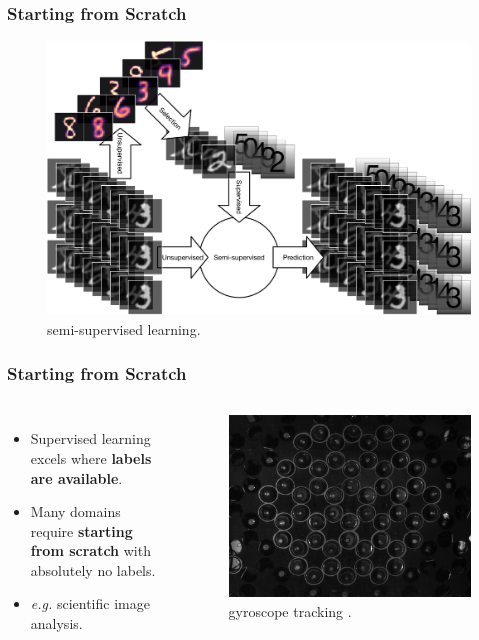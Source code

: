 \documentclass[10pt, usenames, dvipsnames, table]{beamer}
\begin{document}
\begin{frame}
  \frametitle{Starting from Scratch}
  \begin{figure}
    \centering
    \includegraphics[width=\linewidth]{docs/query_selection}
    \caption{semi-supervised learning.}
    \label{fig:semi-supervised}
  \end{figure}
\end{frame}

\begin{frame}
  \frametitle{Starting from Scratch}
  \begin{columns}
    \begin{itemize}
    \item Supervised learning excels where \textbf{labels are available}.
      \pause{}
    \item Many domains require \textbf{starting from scratch} with absolutely no
      labels.
      \pause{}
    \item \emph{e.g.} scientific image analysis.
    \end{itemize}
    \begin{figure}
      \centering
      \includegraphics[width=\linewidth]{docs/gyros}
      \caption{gyroscope tracking \cite{nash_topological_2015}.}
      \label{fig:scientific-images}
    \end{figure}
  \end{columns}
\end{frame}
\end{document}
